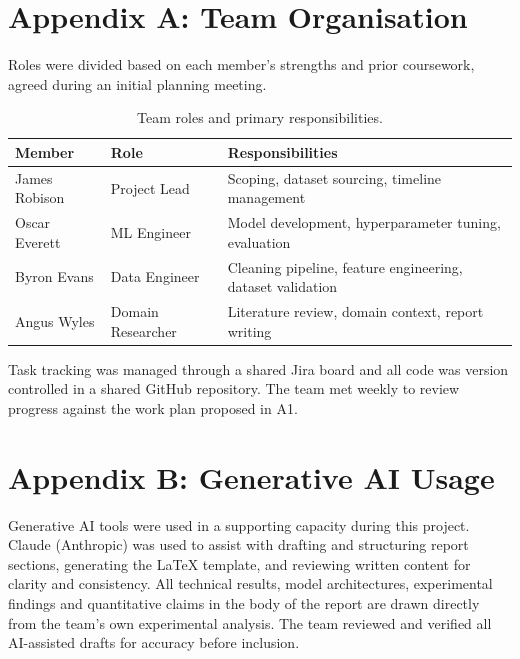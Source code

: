 \documentclass[12pt, a4paper]{article}
\begin{document}
\newpage



\newpage
\appendix
\section*{Appendix A: Team Organisation}

Roles were divided based on each member's strengths and prior coursework,
agreed during an initial planning meeting.

\begin{table}[H]
\centering
\caption{Team roles and primary responsibilities.}
\begin{tabularx}{\linewidth}{llX}
\toprule
\textbf{Member} & \textbf{Role} & \textbf{Responsibilities} \\
\midrule
James Robison  & Project Lead      & Scoping, dataset sourcing, timeline management \\
Oscar Everett  & ML Engineer       & Model development, hyperparameter tuning, evaluation \\
Byron Evans    & Data Engineer     & Cleaning pipeline, feature engineering, dataset validation \\
Angus Wyles    & Domain Researcher & Literature review, domain context, report writing \\
\bottomrule
\end{tabularx}
\end{table}

Task tracking was managed through a shared Jira board and all code was version
controlled in a shared GitHub repository. The team met weekly to review
progress against the work plan proposed in A1.

\section*{Appendix B: Generative AI Usage}

Generative AI tools were used in a supporting capacity during this project.
Claude (Anthropic) was used to assist with drafting and structuring report
sections, generating the \LaTeX{} template, and reviewing written content for
clarity and consistency. All technical results, model architectures,
experimental findings and quantitative claims in the body of the report are
drawn directly from the team's own experimental analysis. The team reviewed
and verified all AI-assisted drafts for accuracy before inclusion.
\end{document}
